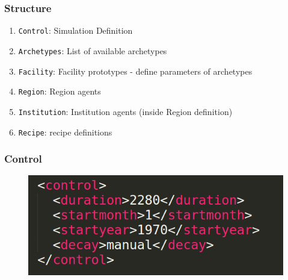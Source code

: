 \begin{frame}
    \frametitle{Structure}
    \begin{enumerate}
        \item \texttt{Control}: Simulation Definition
        \item \texttt{Archetypes}: List of available archetypes
        \item \texttt{Facility}: Facility prototypes - define parameters of archetypes
        \item \texttt{Region}: Region agents
        \item \texttt{Institution}: Institution agents (inside Region definition)
        \item \texttt{Recipe}: recipe definitions
    \end{enumerate}
\end{frame}

\begin{frame}
    \frametitle{Control}
\begin{figure}[htbp!]
        \begin{center}
                \includegraphics[width=.8\textwidth]{./images/control.png}
        \end{center}
    \end{figure}

\end{frame}

